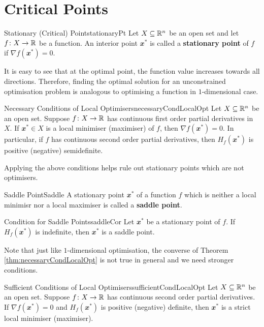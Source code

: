 \documentclass[math, code]{amznotes}
\theoremstyle{remark}
\begin{document}
\section{Critical Points}
\begin{dfnbox}{Stationary (Critical) Point}{stationaryPt}
    Let $X \subseteq \mathbb{R}^n$ be an open set and let $f \colon X \to \mathbb{R}$ be a function. An interior point $\mathbfit{x}^*$ is called a {\color{red} \textbf{stationary point}} of $f$ if $\nabla f(\mathbfit{x}^*) = \mathbfit{0}$.
\end{dfnbox}
It is easy to see that at the optimal point, the function value increases towards all directions. Therefore, finding the optimal solution for an unconstrained optimisation problem is analogous to optimising a function in $1$-dimensional case.
\begin{thmbox}{Necessary Conditions of Local Optimisers}{necessaryCondLocalOpt}
    Let $X \subseteq \mathbb{R}^n$ be an open set. Suppose $f \colon X \to \mathbb{R}$ has continuous first order partial derivatives in $X$. If $\mathbfit{x}^* \in X$ is a local minimiser (maximiser) of $f$, then $\nabla f(\mathbfit{x}^*) = \mathbfit{0}$. In particular, if $f$ has continuous second order partial derivatives, then $H_f(\mathbfit{x}^*)$ is positive (negative) semidefinite.
\end{thmbox}
Applying the above conditions helps rule out stationary points which are not optimisers.
\begin{dfnbox}{Saddle Point}{Saddle}
    A stationary point $\mathbfit{x}^*$ of a function $f$ which is neither a local minimisr nor a local maximiser is called a {\color{red} \textbf{saddle point}}.
\end{dfnbox}
\begin{corbox}{Condition for Saddle Points}{saddleCor}
    Let $\mathbfit{x}^*$ be a stationary point of $f$. If $H_f(\mathbfit{x}^*)$ is indefinite, then $\mathbfit{x}^*$ is a saddle point.
\end{corbox}
Note that just like $1$-dimensional optimisation, the converse of Theorem \ref{thm:necessaryCondLocalOpt} is not true in general and we need stronger conditions.
\begin{thmbox}{Sufficient Conditions of Local Optimisers}{sufficientCondLocalOpt}
    Let $X \subseteq \mathbb{R}^n$ be an open set. Suppose $f \colon X \to \mathbb{R}$ has continuous second order partial derivatives. If $\nabla f(\mathbfit{x}^*) = \mathbfit{0}$ and $H_f(\mathbfit{x}^*)$ is positive (negative) definite, then $\mathbfit{x}^*$ is a strict local minimiser (maximiser).
\end{thmbox}
\end{document}
